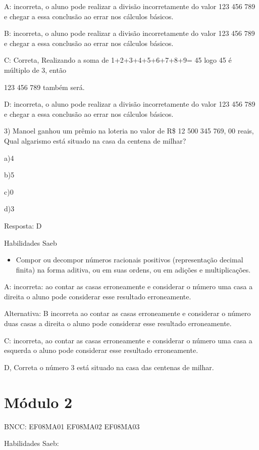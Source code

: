 A: incorreta, o aluno pode realizar a divisão incorretamente do valor
123 456 789 e chegar a essa conclusão ao errar nos cálculos básicos.

B: incorreta, o aluno pode realizar a divisão incorretamente do valor
123 456 789 e chegar a essa conclusão ao errar nos cálculos básicos.

C: Correta, Realizando a soma de 1+2+3+4+5+6+7+8+9= 45 logo 45 é
múltiplo de 3, então

123 456 789 também será.

D: incorreta, o aluno pode realizar a divisão incorretamente do valor
123 456 789 e chegar a essa conclusão ao errar nos cálculos básicos.

3) Manoel ganhou um prêmio na loteria no valor de R\$ 12 500 345 769, 00
reais, Qual algarismo está situado na casa da centena de milhar?

a)4

b)5

c)0

d)3

Resposta: D

Habilidades Saeb

\begin{itemize}
\tightlist
\item
  Compor ou decompor números racionais positivos (representação decimal
  finita) na forma aditiva, ou em suas ordens, ou em adições e
  multiplicações.
\end{itemize}

A: incorreta: ao contar as casas erroneamente e considerar o número uma
casa a direita o aluno pode considerar esse resultado erroneamente.

Alternativa: B incorreta ao contar as casas erroneamente e considerar o
número duas casas a direita o aluno pode considerar esse resultado
erroneamente.

C: incorreta, ao contar as casas erroneamente e considerar o número uma
casa a esquerda o aluno pode considerar esse resultado erroneamente.

D, Correta o número 3 está situado na casa das centenas de milhar.

\hypertarget{muxf3dulo-2}{%
\section{Módulo 2}\label{muxf3dulo-2}}

BNCC: EF08MA01 EF08MA02 EF08MA03

Habilidades Saeb:

